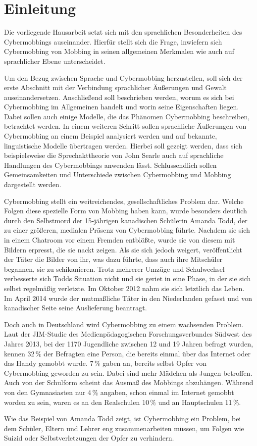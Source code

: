 \section{Einleitung}
Die vorliegende Hausarbeit setzt sich mit den sprachlichen Besonderheiten des Cybermobbings auseinander.
Hierfür stellt sich die Frage, inwiefern sich Cybermobbing von Mobbing in seinen allgemeinen Merkmalen wie auch auf sprachlicher Ebene unterscheidet.

Um den Bezug zwischen Sprache und Cybermobbing herzustellen, soll sich der erste Abschnitt mit der Verbindung sprachlicher Äußerungen und Gewalt auseinandersetzen.
Anschließend soll beschrieben werden, worum es sich bei Cybermobbing im Allgemeinen handelt und worin seine Eigenschaften liegen.
Dabei sollen auch einige Modelle, die das Phänomen Cybermobbing beschreiben, betrachtet werden.
In einem weiteren Schritt sollen sprachliche Äußerungen von Cybermobbing an einem  Beispiel analysiert werden und auf bekannte, linguistische Modelle übertragen werden.
Hierbei soll gezeigt werden, dass sich beispielsweise die Sprechakttheorie von John Searle auch auf sprachliche Handlungen des Cybermobbings anwenden lässt.
Schlussendlich sollen Gemeinsamkeiten und Unterschiede zwischen Cybermobbing und Mobbing dargestellt werden.

Cybermobbing stellt ein weitreichendes, gesellschaftliches Problem dar.
Welche Folgen diese spezielle Form von Mobbing haben kann, wurde besonders deutlich durch den Selbstmord der 15-jährigen kanadischen Schülerin Amanda Todd, der zu einer größeren, medialen Präsenz von Cybermobbing führte.
Nachdem sie sich in einem Chatroom vor einem Fremden entblößte, wurde sie von diesem mit Bildern erpresst, die sie nackt zeigen.
Als sie sich jedoch weigert, veröffentlicht der Täter die Bilder von ihr, was dazu führte, dass auch ihre Mitschüler begannen, sie zu schikanieren.
Trotz mehrerer Umzüge und Schulwechsel verbesserte sich Todds Situation nicht und sie geriet in eine Phase, in der sie sich selbst regelmäßig verletzte.
Im Oktober 2012 nahm sie sich letztlich das Leben.
Im April 2014 wurde der mutmaßliche Täter in den Niederlanden gefasst und von kanadischer Seite seine Auslieferung beantragt.

Doch auch in Deutschland wird Cybermobbing zu einem wachsenden Problem.
Laut der JIM-Studie des Medienpädagogischen Forschungsverbundes Südwest des Jahres 2013, bei der 1170 Jugendliche zwischen 12 und 19 Jahren befragt wurden, kennen 32\,\% der Befragten eine Person, die bereits einmal über das Internet oder das Handy gemobbt wurde.
7\,\% gaben an, bereits selbst Opfer von Cybermobbing geworden zu sein.
Dabei sind mehr Mädchen als Jungen betroffen.
Auch von der Schulform scheint das Ausmaß des Mobbings abzuhängen.
Während von den Gymnasiasten nur 4\,\% angaben, schon einmal im Internet gemobbt worden zu sein, waren es an den Realschulen 10\,\% und an Hauptschulen 11\,\%. \cite[S.\,44]{SF13}
 
Wie das Beispiel von Amanda Todd zeigt, ist Cybermobbing ein Problem, bei dem Schüler, Eltern und Lehrer eng zusammenarbeiten müssen, um Folgen wie Suizid oder Selbstverletzungen der Opfer zu verhindern.
